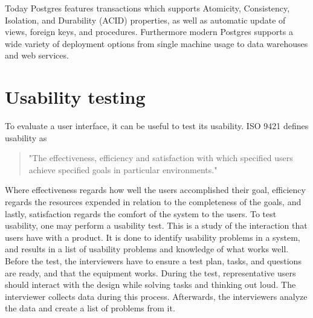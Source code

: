 Today Postgres features transactions which supports Atomicity, Consistency, Isolation, and Durability (ACID) properties, as well as automatic update of views, foreign keys, and procedures. 
Furthermore modern Postgres supports a wide variety of deployment options from single machine usage to data warehouses and web services\cite{Postgres_Docs}.

\section*{Usability testing}
To evaluate a user interface, it can be useful to test its usability. ISO 9421 defines usability as
\begin{quote}
	"The effectiveness, efficiency and satisfaction with which specified users achieve specified goals in particular environments."
\end{quote}

Where effectiveness regards how well the users accomplished their goal, efficiency regards the resources expended in relation to the completeness of the goals, and lastly, satisfaction regards the comfort of the system to the users.
To test usability, one may perform a usability test. This is a study of the interaction that users have with a product. It is done to identify usability problems in a system, and results in a list of usability problems and knowledge of what works well.
Before the test, the interviewers have to ensure a test plan, tasks, and questions are ready, and that the equipment works.
During the test, representative users should interact with the design while solving tasks and thinking out loud. The interviewer collects data during this process.
Afterwards, the interviewers analyze the data and create a list of problems from it.
\cite{deb7}